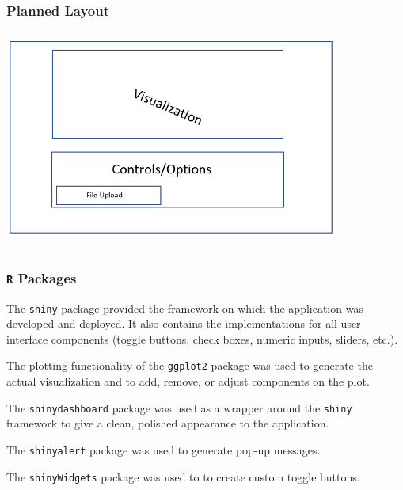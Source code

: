 \documentclass[handout, xcolor=dvipsnames]{beamer}
\begin{document}
\begin{frame}
	\frametitle{Planned Layout}
	\begin{center}
	\includegraphics[height=7cm,width=11cm]{figures/proto_app_layout.png}
	\end{center}	
\end{frame}

\subsection{}
\begin{frame}
	\frametitle{{\tt R} Packages}
	\begin{description}[labelwidth=4em]

\item[{\bf shiny:}] {\footnotesize The {\tt shiny} package \citep{SHINY} provided the framework on which the application was developed and deployed. It also contains the implementations for all user-interface components (toggle buttons, check boxes, numeric inputs, sliders, etc.).}

\item[{\bf ggplot2:}] {\footnotesize The plotting functionality of the {\tt ggplot2} package \citep{GGPLOT} was used to generate the actual visualization and to add, remove, or adjust components on the plot.}

\item[{\bf shinydashboard:}] {\footnotesize The {\tt shinydashboard} package \citep{DASH} was used as a wrapper around the {\tt shiny} framework to give a clean, polished appearance to the application.}

\item[{\bf shinyalert:}] {\footnotesize The {\tt shinyalert} package \citep{SALERT} was used to generate pop-up messages.}

\item[{\bf shinyWidgets:}] {\footnotesize The {\tt shinyWidgets} package \citep{SWIDGET} was used to to create custom toggle buttons.}

\end{description}
\end{frame}
\end{document}
